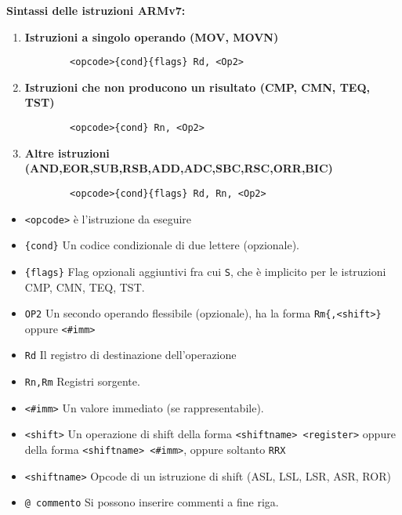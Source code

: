 \begin{defn}
	\textbf{Sintassi delle istruzioni ARMv7:}
	
	
	\begin{enumerate}
		\item \textbf{Istruzioni a singolo operando (MOV, MOVN)}
		\begin{Verbatim}
		<opcode>{cond}{flags} Rd, <Op2>
		\end{Verbatim}
		
		\item \textbf{Istruzioni che non producono un risultato (CMP, CMN, TEQ, TST)}
		\begin{Verbatim}
		<opcode>{cond} Rn, <Op2>
		\end{Verbatim}
		
		\item \textbf{Altre istruzioni (AND,EOR,SUB,RSB,ADD,ADC,SBC,RSC,ORR,BIC)}
		\begin{Verbatim}
		<opcode>{cond}{flags} Rd, Rn, <Op2>
		\end{Verbatim}
	\end{enumerate}
	
	
	\begin{itemize}
		\item \verb|<opcode>| è l'istruzione da eseguire
		\item \verb|{cond}| Un codice condizionale di due lettere (opzionale).
		\item \verb|{flags}| Flag opzionali aggiuntivi fra cui \verb|S|, che è implicito per le istruzioni CMP, CMN, TEQ, TST.
		\item \verb|OP2| Un secondo operando flessibile (opzionale), ha la forma \verb|Rm{,<shift>}| oppure \verb|<#imm>|
		\item \verb|Rd| Il registro di destinazione dell'operazione
		\item \verb|Rn,Rm| Registri sorgente.
		\item \verb|<#imm>| Un valore immediato (se rappresentabile).
		\item \verb|<shift>| Un operazione di shift della forma \verb|<shiftname> <register>| oppure della forma \verb|<shiftname> <#imm>|, oppure soltanto \verb|RRX|
		\item \verb|<shiftname>| Opcode di un istruzione di shift (ASL, LSL, LSR, ASR, ROR)
		\item \verb|@ commento| Si possono inserire commenti a fine riga.
	\end{itemize}
\end{defn}


